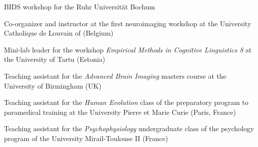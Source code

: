 
BIDS workshop for the Ruhr Universität Bochum

Co-organizer and instructor at the first neuroimaging workshop
at the University Catholique de Louvain of (Belgium)

Mini-lab leader for the workshop \textit{Empirical Methods in Cognitive Linguistics 8}
at the University of Tartu (Estonia)

Teaching assistant for the \textit{Advanced Brain Imaging} masters course
at the University of Birmingham (UK)

Teaching assistant for the \textit{Human Evolution} class of the preparatory program
to paramedical training at the University Pierre et Marie Curie (Paris, France)

Teaching assistant for the \textit{Psychophysiology} undergraduate class
of the psychology program of the University Mirail-Toulouse II (France)
